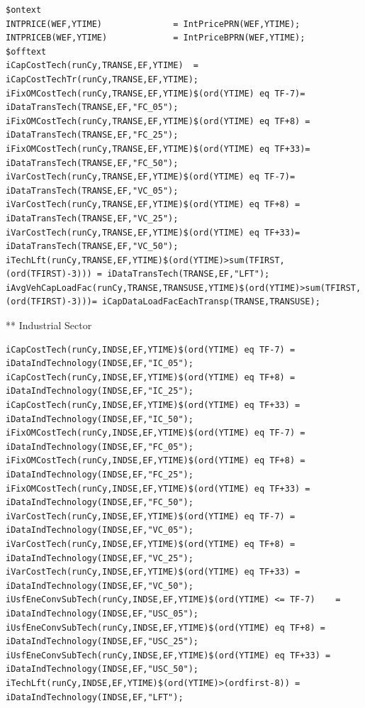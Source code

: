 \documentclass[a4paper,]{scrartcl}
\begin{document}
\begin{lstlisting}
$ontext
INTPRICE(WEF,YTIME)              = IntPricePRN(WEF,YTIME);
INTPRICEB(WEF,YTIME)             = IntPriceBPRN(WEF,YTIME);
$offtext
iCapCostTech(runCy,TRANSE,EF,YTIME)  = iCapCostTechTr(runCy,TRANSE,EF,YTIME);
iFixOMCostTech(runCy,TRANSE,EF,YTIME)$(ord(YTIME) eq TF-7)= iDataTransTech(TRANSE,EF,"FC_05");
iFixOMCostTech(runCy,TRANSE,EF,YTIME)$(ord(YTIME) eq TF+8) = iDataTransTech(TRANSE,EF,"FC_25");
iFixOMCostTech(runCy,TRANSE,EF,YTIME)$(ord(YTIME) eq TF+33)= iDataTransTech(TRANSE,EF,"FC_50");
iVarCostTech(runCy,TRANSE,EF,YTIME)$(ord(YTIME) eq TF-7)= iDataTransTech(TRANSE,EF,"VC_05");
iVarCostTech(runCy,TRANSE,EF,YTIME)$(ord(YTIME) eq TF+8) = iDataTransTech(TRANSE,EF,"VC_25");
iVarCostTech(runCy,TRANSE,EF,YTIME)$(ord(YTIME) eq TF+33)= iDataTransTech(TRANSE,EF,"VC_50");
iTechLft(runCy,TRANSE,EF,YTIME)$(ord(YTIME)>sum(TFIRST,(ord(TFIRST)-3))) = iDataTransTech(TRANSE,EF,"LFT");
iAvgVehCapLoadFac(runCy,TRANSE,TRANSUSE,YTIME)$(ord(YTIME)>sum(TFIRST,(ord(TFIRST)-3)))= iCapDataLoadFacEachTransp(TRANSE,TRANSUSE);
\end{lstlisting}

** Industrial Sector

\begin{lstlisting}
iCapCostTech(runCy,INDSE,EF,YTIME)$(ord(YTIME) eq TF-7) = iDataIndTechnology(INDSE,EF,"IC_05");
iCapCostTech(runCy,INDSE,EF,YTIME)$(ord(YTIME) eq TF+8) = iDataIndTechnology(INDSE,EF,"IC_25");
iCapCostTech(runCy,INDSE,EF,YTIME)$(ord(YTIME) eq TF+33) = iDataIndTechnology(INDSE,EF,"IC_50");
iFixOMCostTech(runCy,INDSE,EF,YTIME)$(ord(YTIME) eq TF-7) = iDataIndTechnology(INDSE,EF,"FC_05");
iFixOMCostTech(runCy,INDSE,EF,YTIME)$(ord(YTIME) eq TF+8) = iDataIndTechnology(INDSE,EF,"FC_25");
iFixOMCostTech(runCy,INDSE,EF,YTIME)$(ord(YTIME) eq TF+33) = iDataIndTechnology(INDSE,EF,"FC_50");
iVarCostTech(runCy,INDSE,EF,YTIME)$(ord(YTIME) eq TF-7) = iDataIndTechnology(INDSE,EF,"VC_05");
iVarCostTech(runCy,INDSE,EF,YTIME)$(ord(YTIME) eq TF+8) = iDataIndTechnology(INDSE,EF,"VC_25");
iVarCostTech(runCy,INDSE,EF,YTIME)$(ord(YTIME) eq TF+33) = iDataIndTechnology(INDSE,EF,"VC_50");
iUsfEneConvSubTech(runCy,INDSE,EF,YTIME)$(ord(YTIME) <= TF-7)    = iDataIndTechnology(INDSE,EF,"USC_05");
iUsfEneConvSubTech(runCy,INDSE,EF,YTIME)$(ord(YTIME) eq TF+8) = iDataIndTechnology(INDSE,EF,"USC_25");
iUsfEneConvSubTech(runCy,INDSE,EF,YTIME)$(ord(YTIME) eq TF+33) = iDataIndTechnology(INDSE,EF,"USC_50");
iTechLft(runCy,INDSE,EF,YTIME)$(ord(YTIME)>(ordfirst-8)) = iDataIndTechnology(INDSE,EF,"LFT");
\end{lstlisting}
\end{document}
